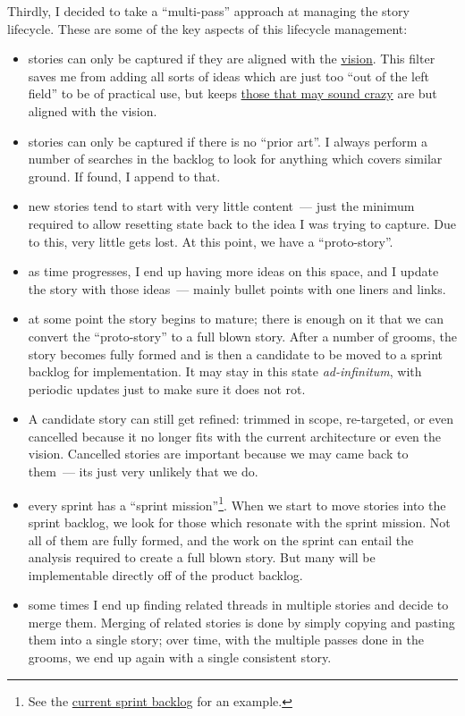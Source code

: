 \documentclass{book}
\begin{document}
Thirdly, I decided to take a ``multi-pass'' approach at managing the
story lifecycle. These are some of the key aspects of this lifecycle
management:

\begin{itemize}
\item stories can only be captured if they are aligned with the
\href{https://github.com/DomainDrivenConsulting/dogen/blob/master/doc/agile/vision.org}{vision}. This filter saves me from adding all sorts of ideas which
are just too ``out of the left field'' to be of practical use, but
keeps \href{https://github.com/DomainDrivenConsulting/dogen/blob/master/doc/agile/product_backlog.org#visionary-work-and-random-ideas}{those that may sound crazy} are but aligned with the vision.
\item stories can only be captured if there is no ``prior art''. I always
perform a number of searches in the backlog to look for anything
which covers similar ground. If found, I append to that.
\item new stories tend to start with very little content~--- just the
  minimum required to allow resetting state back to the idea I was
  trying to capture. Due to this, very little gets lost. At this
  point, we have a ``proto-story''.
\item as time progresses, I end up having more ideas on this space, and I
update the story with those ideas~--- mainly bullet points with one
liners and links.
\item at some point the story begins to mature; there is enough on it that
we can convert the ``proto-story'' to a full blown story. After a
number of grooms, the story becomes fully formed and is then a
candidate to be moved to a sprint backlog for implementation. It may
stay in this state \emph{ad-infinitum}, with periodic updates just to
make sure it does not rot.
\item A candidate story can still get refined: trimmed in scope,
re-targeted, or even cancelled because it no longer fits with the
current architecture or even the vision. Cancelled stories are
important because we may came back to them~--- its just very unlikely
that we do.
\item every sprint has a ``sprint mission''\footnote{See the \href{https://github.com/DomainDrivenConsulting/dogen/blob/master/doc/agile/sprint_backlog_78.org}{current sprint backlog} for an example.}. When we start to
move stories into the sprint backlog, we look for those which
resonate with the sprint mission. Not all of them are fully formed,
and the work on the sprint can entail the analysis required to
create a full blown story. But many will be implementable directly
off of the product backlog.
\item some times I end up finding related threads in multiple stories and
decide to merge them. Merging of related stories is done by simply
copying and pasting them into a single story; over time, with the
multiple passes done in the grooms, we end up again with a single
consistent story.
\end{itemize}
\end{document}
